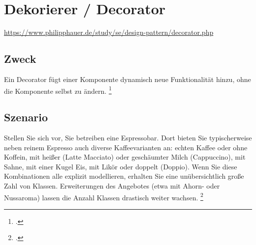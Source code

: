 \documentclass{lehramt-informatik-haupt}
\begin{document}

\chapter{Dekorierer / Decorator}

\begin{quellen}
\item \cite{wiki:dekorierer}
\item \cite[Seite 149-156]{gof}
\item \url{https://www.philipphauer.de/study/se/design-pattern/decorator.php}
\item \cite[Kapitel 8.5.2, Seite 274-278]{schatten}
\item \cite[Seite 274]{schatten}
\item \cite[Kapitel 5.3, Seite 83-86]{eilebrecht}
\item \cite[Kapitel 22, Seite 269]{siebler}
\end{quellen}

%

\section{Zweck}

Ein Decorator fügt einer Komponente dynamisch neue Funktionalität
hinzu, ohne die Komponente selbst zu ändern.
\footcite[Seite 83]{eilebrecht}

\section{Szenario}

Stellen Sie sich vor, Sie betreiben eine Espressobar. Dort bieten Sie
typischerweise neben reinem Espresso auch diverse Kaffeevarianten an:
echten Kaffee oder ohne Koffein, mit heißer (Latte Macciato) oder
geschäumter Milch (Cappuccino), mit Sahne, mit einer Kugel Eis, mit
Likör oder doppelt (Doppio). Wenn Sie diese Kombinationen alle explizit
modellieren, erhalten Sie eine unübersichtlich große Zahl von Klassen.
Erweiterungen des Angebotes (etwa mit Ahorn- oder Nussaroma) lassen die
Anzahl Klassen drastisch weiter wachsen.
\footcite[Seite 83]{eilebrecht}

%
\end{document}

